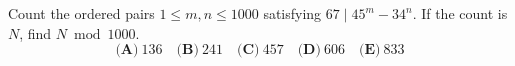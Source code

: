 Count the ordered pairs $1\le m,n\le1000$ satisfying $67\mid45^m-34^n$. If the count is $N$, find $N\bmod1000$.
\[\textbf{(A)}~136\quad\textbf{(B)}~241\quad\textbf{(C)}~457\quad\textbf{(D)}~606\quad\textbf{(E)}~833\]
